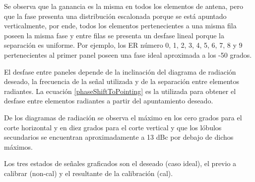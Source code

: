 Se observa que la ganancia es la misma en todos los elementos de antena, pero que la fase presenta una distribución escalonada
porque se está apuntado verticalmente, por ende, todos los elementos pertenecientes a una misma fila poseen la misma fase y entre
filas se presenta un desfase lineal porque la separación es uniforme. Por ejemplo, los ER número 0, 1, 2, 3, 4, 5, 6, 7, 8 y 9
pertenecientes al primer panel poseen una fase ideal aproximada a los -50 grados.

El desfase entre paneles depende de la inclinación del diagrama de radiación deseado, la frecuencia de la señal utilizada y de la
separación entre elementos radiantes. La ecuación \ref{phaseShiftToPointing} es la utilizada para obtener el desfase entre 
elementos radiantes a partir del apuntamiento deseado.


De los diagramas de radiación se observa el máximo en los cero grados para el corte horizontal y en diez grados para el corte
vertical y que los lóbulos secundarios se encuentran aproximadamente a 13 dBc por debajo de dichos máximos.

Los tres estados de señales graficados son el deseado (caso ideal), el previo a calibrar (non-cal) y el resultante de la
calibración (cal).

